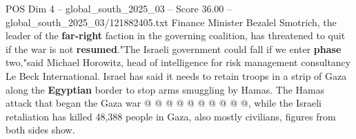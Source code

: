 \begin{textsample}{POS Dim 4 – global\_south\_2025\_03 – Score 36.00 – global\_south\_2025\_03/121882405.txt}
Finance Minister Bezalel Smotrich, the leader of the \textbf{far-right} faction in the governing coalition, has threatened to quit if the war is not \textbf{resumed}."The Israeli government could fall if we enter \textbf{phase} two,"said Michael Horowitz, head of intelligence for risk management consultancy Le Beck International.
Israel has said it needs to retain troops in a strip of Gaza along the \textbf{Egyptian} border to stop arms smuggling by Hamas.
The Hamas attack that began the Gaza war @ @ @ @ @ @ @ @ @ @, while the Israeli retaliation has killed 48,388 people in Gaza, also mostly civilians, figures from both sides show.

\end{textsample}
